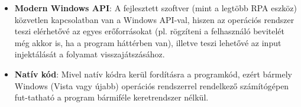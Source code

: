 \begin{itemize}
	\item \textbf{Modern Windows API}: A fejlesztett szoftver (mint a legtöbb RPA eszköz) közvetlen kapcsolatban van a Windows API-val, hiszen az operációs rendszer teszi elérhetővé az egyes erőforrásokat (pl. rögzíteni a felhasználó bevitelét még akkor is, ha a program háttérben van), illetve teszi lehetővé az input injektálását a folyamat visszajátszásához.
	\item \textbf{Natív kód}: Mivel natív kódra kerül fordításra a programkód, ezért bármely Windows (Vista vagy újabb) operációs rendszerrel rendelkező számítógépen fut\hyp{}tatható a program bármiféle keretrendszer nélkül.
\end{itemize}














